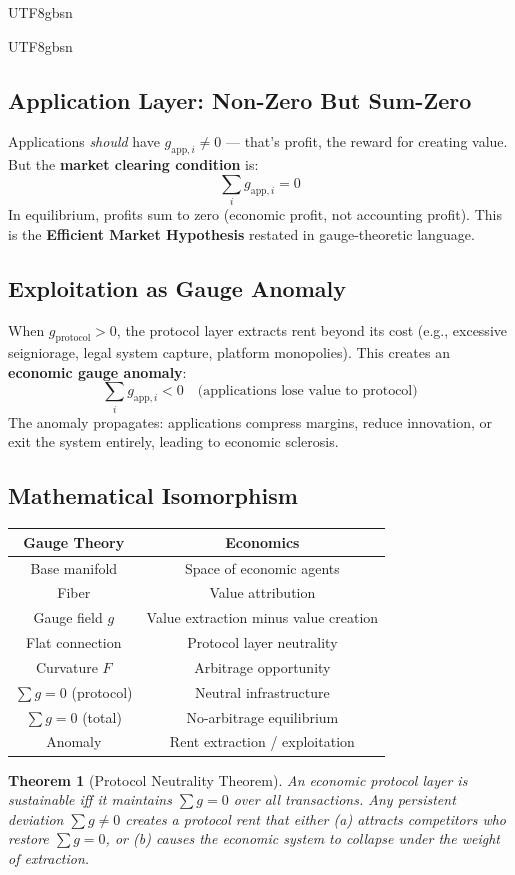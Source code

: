 \documentclass[11pt,a4paper]{article}
\newtheorem{theorem}{Theorem}[section]
\begin{document}
\begin{CJK}{UTF8}{gbsn}
{\begin{CJK}{UTF8}{gbsn}
\subsection{Application Layer: Non-Zero But Sum-Zero}
Applications \textit{should} have $g_{\text{app}, i} \neq 0$ --- that's profit, the
reward for creating value. But the \textbf{market clearing condition} is:
\begin{equation}
    \sum_i g_{\text{app}, i} = 0
\end{equation}
In equilibrium, profits sum to zero (economic profit, not accounting profit).
This is the \textbf{Efficient Market Hypothesis} restated in gauge-theoretic language.
\subsection{Exploitation as Gauge Anomaly}
When $g_{\text{protocol}} > 0$, the protocol layer extracts rent beyond its cost
(e.g., excessive seigniorage, legal system capture, platform monopolies). This
creates an \textbf{economic gauge anomaly}:
\begin{equation}
    \sum_i g_{\text{app}, i} < 0 \quad \text{(applications lose value to protocol)}
\end{equation}
The anomaly propagates: applications compress margins, reduce innovation, or
exit the system entirely, leading to economic sclerosis.
\subsection{Mathematical Isomorphism}
\begin{center}
\begin{tabular}{c|c}
    \textbf{Gauge Theory} & \textbf{Economics} \\
    \hline
    Base manifold & Space of economic agents \\
    Fiber & Value attribution \\
    Gauge field $g$ & Value extraction minus value creation \\
    Flat connection & Protocol layer neutrality \\
    Curvature $F$ & Arbitrage opportunity \\
    $\sum g = 0$ (protocol) & Neutral infrastructure \\
    $\sum g = 0$ (total) & No-arbitrage equilibrium \\
    Anomaly & Rent extraction / exploitation \\
\end{tabular}
\end{center}
\begin{theorem}[Protocol Neutrality Theorem]
An economic protocol layer is \textit{sustainable} iff it maintains $\sum g = 0$
over all transactions. Any persistent deviation $\sum g \neq 0$ creates a
\textit{protocol rent} that either (a) attracts competitors who restore $\sum g = 0$,
or (b) causes the economic system to collapse under the weight of extraction.
\end{theorem}

\end{CJK}}
\end{CJK}
\end{document}

